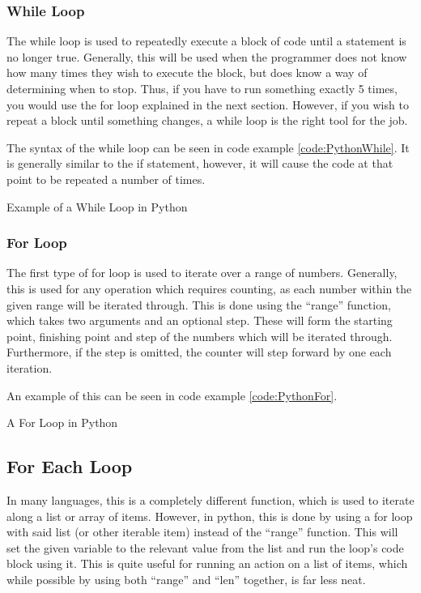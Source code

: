 			\subsubsection{While Loop}
				The while loop is used to repeatedly execute a block of code until a statement is no longer true. 
				Generally, this will be used when the programmer does not know how many times they wish to execute the block, 
				but does know a way of determining when to stop. 
				Thus, if you have to run something exactly 5 times, you would use the for loop explained in the next section. 
				However, if you wish to repeat a block until something changes, a while loop is the right tool for the job. 

				The syntax of the while loop can be seen in code example \ref{code:PythonWhile}. 
				It is generally similar to the if statement, however, it will cause the code at that point to be repeated a number of times. 
				\begin{code}
					
					\caption{Example of a While Loop in Python}
					\label{code:PythonWhile}
				\end{code}

			\subsubsection{For Loop}
				The first type of for loop is used to iterate over a range of numbers. 
				Generally, this is used for any operation which requires counting, as each number within the given range will be iterated through. 
				This is done using the ``range'' function, which takes two arguments and an optional step. 
				These will form the starting point, finishing point and step of the numbers which will be iterated through. 
				Furthermore, if the step is omitted, the counter will step forward by one each iteration. 

				An example of this can be seen in code example \ref{code:PythonFor}.
				\begin{code}
					
					\caption{A For Loop in Python}
					\label{code:PythonFor}
				\end{code}

			\subsection{For Each Loop}
				In many languages, this is a completely different function, which is used to iterate along a list or array of items. 
				However, in python, this is done by using a for loop with said list (or other iterable item) instead of the ``range'' function. 
				This will set the given variable to the relevant value from the list and run the loop's code block using it. 
				This is quite useful for running an action on a list of items, which while possible by using both ``range'' and ``len'' together, is far less neat. 

